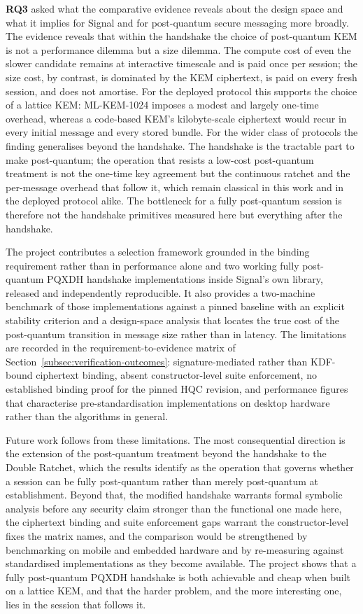 \textbf{RQ3} asked what the comparative evidence reveals about the design space and what it implies for Signal and for post-quantum secure messaging more broadly. The evidence reveals that within the handshake the choice of post-quantum KEM is not a performance dilemma but a size dilemma. The compute cost of even the slower candidate remains at interactive timescale and is paid once per session; the size cost, by contrast, is dominated by the KEM ciphertext, is paid on every fresh session, and does not amortise. For the deployed protocol this supports the choice of a lattice KEM: ML-KEM-1024 imposes a modest and largely one-time overhead, whereas a code-based KEM's kilobyte-scale ciphertext would recur in every initial message and every stored bundle. For the wider class of protocols the finding generalises beyond the handshake. The handshake is the tractable part to make post-quantum; the operation that resists a low-cost post-quantum treatment is not the one-time key agreement but the continuous ratchet and the per-message overhead that follow it, which remain classical in this work and in the deployed protocol alike. The bottleneck for a fully post-quantum session is therefore not the handshake primitives measured here but everything after the handshake.

The project contributes a selection framework grounded in the binding requirement rather than in performance alone and two working fully post-quantum PQXDH handshake implementations inside Signal's own library, released and independently reproducible. It also provides a two-machine benchmark of those implementations against a pinned baseline with an explicit stability criterion and a design-space analysis that locates the true cost of the post-quantum transition in message size rather than in latency. The limitations are recorded in the requirement-to-evidence matrix of Section~\ref{subsec:verification-outcomes}: signature-mediated rather than KDF-bound ciphertext binding, absent constructor-level suite enforcement, no established binding proof for the pinned HQC revision, and performance figures that characterise pre-standardisation implementations on desktop hardware rather than the algorithms in general.

Future work follows from these limitations. The most consequential direction is the extension of the post-quantum treatment beyond the handshake to the Double Ratchet, which the results identify as the operation that governs whether a session can be fully post-quantum rather than merely post-quantum at establishment. Beyond that, the modified handshake warrants formal symbolic analysis before any security claim stronger than the functional one made here, the ciphertext binding and suite enforcement gaps warrant the constructor-level fixes the matrix names, and the comparison would be strengthened by benchmarking on mobile and embedded hardware and by re-measuring against standardised implementations as they become available. The project shows that a fully post-quantum PQXDH handshake is both achievable and cheap when built on a lattice KEM, and that the harder problem, and the more interesting one, lies in the session that follows it.